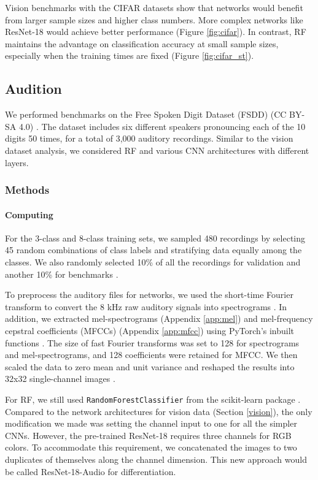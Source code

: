 Vision benchmarks with the CIFAR datasets show that networks would benefit from larger sample sizes and higher class numbers. More complex networks like ResNet-18 would achieve better performance (Figure \ref{fig:cifar}). In contrast, RF maintains the advantage on classification accuracy at small sample sizes, especially when the training times are fixed (Figure \ref{fig:cifar_st}).

\subsection{Audition}
\label{audition}
We performed benchmarks on the Free Spoken Digit Dataset (FSDD) (CC BY-SA 4.0) \citep{FSDD}. The dataset includes six different speakers pronouncing each of the 10 digits 50 times, for a total of 3,000 auditory recordings. Similar to the vision dataset analysis, we considered RF and various CNN architectures with different layers.

\subsubsection{Methods}
\paragraph{Computing}
For the 3-class and 8-class training sets, we sampled 480 recordings by selecting 45 random combinations of class labels and stratifying data equally among the classes. We also randomly selected 10\% of all the recordings for validation and another 10\% for benchmarks \citep{nasr, tian}.

To preprocess the auditory files for networks, we used the short-time Fourier transform to convert the 8 kHz raw auditory signals into spectrograms \citep{wyse}. In addition, we extracted mel-spectrograms (Appendix \ref{app:mel}) and mel-frequency cepstral coefficients (MFCCs) (Appendix \ref{app:mfcc}) using PyTorch's inbuilt functions \citep{pytorch}.
The size of fast Fourier transforms was set to 128 for spectrograms and mel-spectrograms, and 128 coefficients were retained for MFCC. We then scaled the data to zero mean and unit variance and reshaped the results into 32x32 single-channel images \citep{lecun2012efficient}. 

For RF, we still used \texttt{RandomForestClassifier} from the scikit-learn package \citep{scikit-learn}. Compared to the network architectures for vision data (Section \ref{vision}), the only modification we made was setting the channel input to one for all the simpler CNNs. However, the pre-trained ResNet-18 requires three channels for RGB colors. To accommodate this requirement, we concatenated the images to two duplicates of themselves along the channel dimension. This new approach would be called ResNet-18-Audio for differentiation.

